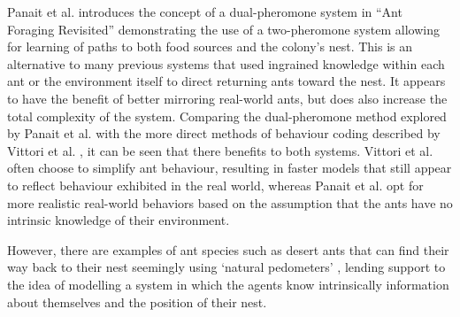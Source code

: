     
    Panait et al. introduces the concept of a dual-pheromone system in ``Ant Foraging Revisited'' \cite{a_panait_ant_2004} demonstrating the use of a two-pheromone system allowing for learning of paths to both food sources
    and the colony's nest. This is an alternative to many previous systems that used ingrained knowledge within each ant or the environment itself to direct returning ants toward the nest. It appears to have the benefit %
    of better mirroring real-world ants, but does also increase the total complexity of the system.
    Comparing the dual-pheromone method explored by Panait et al. \cite{a_panait_ant_2004} with the more direct methods of behaviour coding described by Vittori et al. \cite{vittori_modeling_2004}, it can be seen that there
    benefits to both systems. Vittori et al. often choose to simplify ant behaviour, resulting in faster models that still appear to reflect behaviour exhibited in the real world, %
    whereas Panait et al. opt for more realistic real-world behaviors based on the assumption that the ants have no intrinsic knowledge of their environment.
    
    However, there are examples of ant species such as desert ants that can find their way back to their nest seemingly using `natural pedometers' \cite{khamsi_2006}, lending support to the idea of modelling a system in which 
    the agents know intrinsically information about themselves and the position of their nest.


